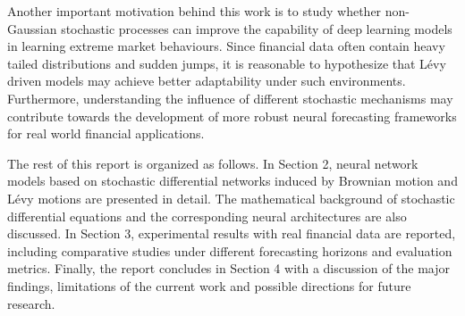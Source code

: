 Another important motivation behind this work is to study whether non-Gaussian stochastic processes can improve the capability of deep learning models in learning extreme market behaviours. Since financial data often contain heavy tailed distributions and sudden jumps, it is reasonable to hypothesize that Lévy driven models may achieve better adaptability under such environments. Furthermore, understanding the influence of different stochastic mechanisms may contribute towards the development of more robust neural forecasting frameworks for real world financial applications.

The rest of this report is organized as follows. In Section 2, neural network models based on stochastic differential networks induced by Brownian motion and Lévy motions are presented in detail. The mathematical background of stochastic differential equations and the corresponding neural architectures are also discussed. In Section 3, experimental results with real financial data are reported, including comparative studies under different forecasting horizons and evaluation metrics. Finally, the report concludes in Section 4 with a discussion of the major findings, limitations of the current work and possible directions for future research.

\clearpage